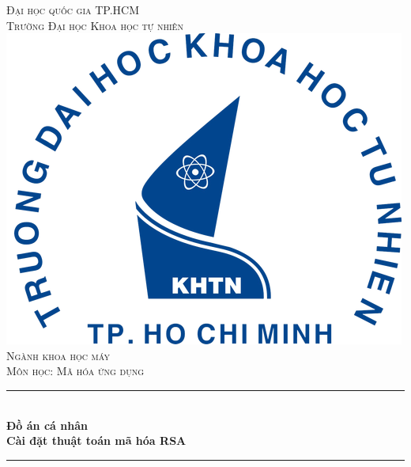 \begin{titlepage}

\newcommand{\HRule}{\rule{\linewidth}{0.5mm}}

\center %
 

\textsc{\LARGE Đại học quốc gia TP.HCM}\\
\textsc{\LARGE Trường Đại học Khoa học tự nhiên}\\[1.5cm]


\includegraphics{logo/rsz_3logo-khtn.png}\\[1cm] %

\textsc{\Large Ngành khoa học máy }\\[0.5cm]
\textsc{\large Môn học: Mã hóa ứng dụng }\\[0.5cm]


\HRule \\[0.4cm]
{ \huge \bfseries Đồ án cá nhân}\\[0.4cm] {\huge \bfseries Cài đặt thuật toán mã hóa RSA}
\HRule \\[1.5cm]
 

\end{titlepage}
